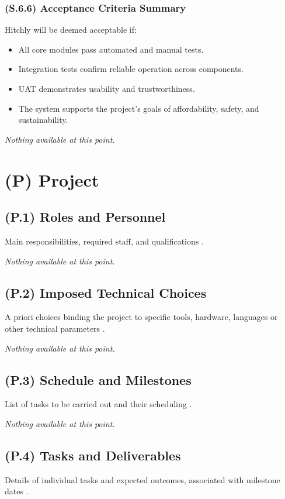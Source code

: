 \documentclass[12pt,letterpaper]{article}
\begin{document}
\subsubsection{(S.6.6) Acceptance Criteria Summary} %
Hitchly will be deemed acceptable if:

\begin{itemize}
    \item All core modules pass automated and manual tests.
    \item Integration tests confirm reliable operation across components.
    \item UAT demonstrates usability and trustworthiness.
    \item The system supports the project’s goals of affordability, safety, and sustainability.
\end{itemize}
\textit{Nothing available at this point.}

\clearpage

\section{(P) Project}

\subsection{(P.1) Roles and Personnel}
Main responsibilities, required staff, and qualifications \cite{meyer2022}.

\textit{Nothing available at this point.}

\subsection{(P.2) Imposed Technical Choices}
A priori choices binding the project to specific tools, hardware, languages or other technical parameters \cite{meyer2022}.

\textit{Nothing available at this point.}

\subsection{(P.3) Schedule and Milestones}
List of tasks to be carried out and their scheduling \cite{meyer2022}.

\textit{Nothing available at this point.}

\subsection{(P.4) Tasks and Deliverables}
Details of individual tasks and expected outcomes, associated with milestone dates \cite{meyer2022}.
\end{document}

